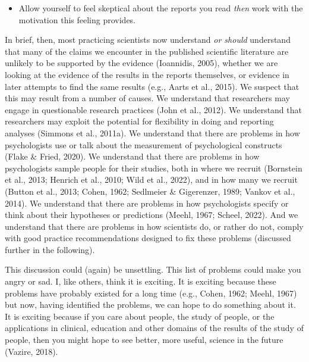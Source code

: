 \documentclass[
  letterpaper,
  DIV=11,
  numbers=noendperiod]{scrreprt}
\providecommand{\tightlist}{%
  \setlength{\itemsep}{0pt}\setlength{\parskip}{0pt}}\usepackage{longtable,booktabs,array}
\begin{document}
\begin{tcolorbox}[enhanced jigsaw, opacitybacktitle=0.6, title=\textcolor{quarto-callout-tip-color}{\faLightbulb}\hspace{0.5em}{Tip}, arc=.35mm, colbacktitle=quarto-callout-tip-color!10!white, colframe=quarto-callout-tip-color-frame, leftrule=.75mm, opacityback=0, breakable, titlerule=0mm, left=2mm, bottomrule=.15mm, toprule=.15mm, colback=white, coltitle=black, bottomtitle=1mm, toptitle=1mm, rightrule=.15mm]

\begin{itemize}
\tightlist
\item
  Allow yourself to feel skeptical about the reports you read
  \emph{then} work with the motivation this feeling provides.
\end{itemize}

\end{tcolorbox}

In brief, then, most practicing scientists now understand \emph{or
should} understand that many of the claims we encounter in the published
scientific literature are unlikely to be supported by the evidence
(Ioannidis, 2005), whether we are looking at the evidence of the results
in the reports themselves, or evidence in later attempts to find the
same results (e.g., Aarts et al., 2015). We suspect that this may result
from a number of causes. We understand that researchers may engage in
questionable research practices (John et al., 2012). We understand that
researchers may exploit the potential for flexibility in doing and
reporting analyses (Simmons et al., 2011a). We understand that there are
problems in how psychologists use or talk about the measurement of
psychological constructs (Flake \& Fried, 2020). We understand that
there are problems in how psychologists sample people for their studies,
both in where we recruit (Bornstein et al., 2013; Henrich et al., 2010;
Wild et al., 2022), and in how many we recruit (Button et al., 2013;
Cohen, 1962; Sedlmeier \& Gigerenzer, 1989; Vankov et al., 2014). We
understand that there are problems in how psychologists specify or think
about their hypotheses or predictions (Meehl, 1967; Scheel, 2022). And
we understand that there are problems in how scientists do, or rather do
not, comply with good practice recommendations designed to fix these
problems (discussed further in the following).

This discussion could (again) be unsettling. This list of problems could
make you angry or sad. I, like others, think it is exciting. It is
exciting because these problems have probably existed for a long time
(e.g., Cohen, 1962; Meehl, 1967) but now, having identified the
problems, we can hope to do something about it. It is exciting because
if you care about people, the study of people, or the applications in
clinical, education and other domains of the results of the study of
people, then you might hope to see better, more useful, science in the
future (Vazire, 2018).
\end{document}
